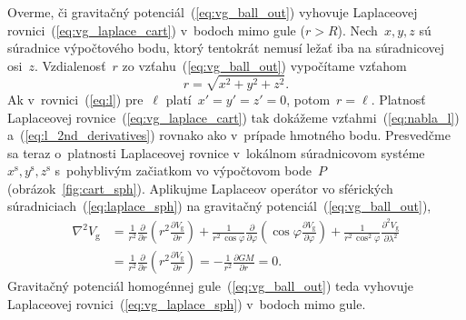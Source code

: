 \documentclass[a4paper, 12pt]{book}
\newcommand{\gidx}{\mathrm g}
\begin{document}
Overme, či gravitačný potenciál~(\ref{eq:vg_ball_out}) vyhovuje Laplaceovej 
rovnici~(\ref{eq:vg_laplace_cart}) v~bodoch mimo gule ($r > R$).  Nech~$x, y, 
z$ sú súradnice výpočtového bodu, ktorý tentokrát nemusí ležať iba na 
súradnicovej osi~$z$.  Vzdialenosť~$r$ zo vzťahu~(\ref{eq:vg_ball_out}) 
vypočítame vzťahom
%
\begin{equation}
\label{eq:spherical_radius}
r = \sqrt{x^2 + y^2 + z^2}.
\end{equation}
%
Ak v~rovnici~(\ref{eq:l}) pre~$\ell$ platí~$x' = y' = z' = 0$, potom~$r 
= \ell$.  Platnosť Laplaceovej rovnice~(\ref{eq:vg_laplace_cart}) tak dokážeme 
vzťahmi~(\ref{eq:nabla_l}) a~(\ref{eq:l_2nd_derivatives}) rovnako ako v~prípade 
hmotného bodu.  Presvedčme sa teraz o~platnosti Laplaceovej rovnice v~lokálnom 
súradnicovom systéme~$x^\mathrm{s}, y^\mathrm{s}, z^\mathrm{s}$ s~pohyblivým 
začiatkom vo výpočtovom bode~$P$ (obrázok~\ref{fig:cart_sph}).  Aplikujme 
Laplaceov operátor vo sférických súradniciach~(\ref{eq:laplace_sph}) na 
gravitačný potenciál~(\ref{eq:vg_ball_out}),
%
\begin{equation}
\begin{split}
\nabla^2 V_\gidx &= \frac{1}{r^2} \frac{\partial}{\partial r} \left( r^2 
\frac{\partial V_\gidx}{\partial r} \right) + \frac{1}{r^2 \, \cos\varphi} 
\frac{\partial}{\partial \varphi} \left( \cos\varphi \frac{\partial 
V_\gidx}{\partial \varphi} \right) + \frac{1}{r^2 \, 
\cos^2\varphi}\frac{\partial^2 V_\gidx}{\partial \lambda^2}\\
%
&= \frac{1}{r^2} \frac{\partial}{\partial r} \left( r^2 \frac{\partial 
V_\gidx}{\partial r} \right) = -\frac{1}{r^2} \frac{\partial GM}{\partial r} 
= 0{.}
\end{split}
\end{equation}
%
Gravitačný potenciál homogénnej gule~(\ref{eq:vg_ball_out}) teda vyhovuje 
Laplaceovej rovnici~(\ref{eq:vg_laplace_sph}) v~bodoch mimo gule.
\end{document}
